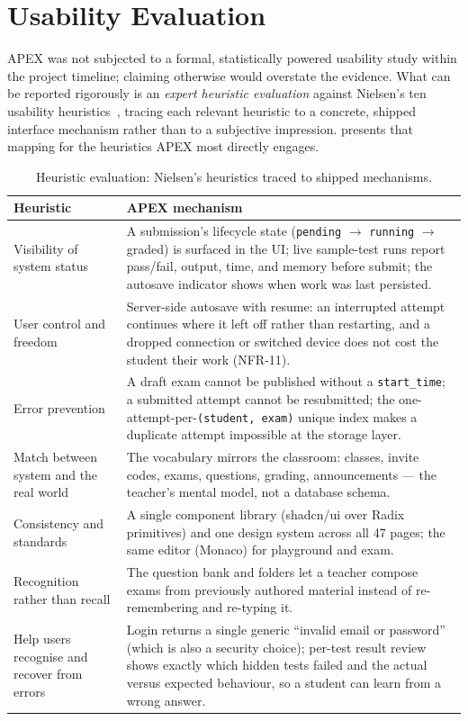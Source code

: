 \section{Usability Evaluation}
\label{sec:res-usability}

APEX was not subjected to a formal, statistically powered usability study within the
project timeline; claiming otherwise would overstate the evidence. What can be
reported rigorously is an \emph{expert heuristic evaluation}
against Nielsen's ten usability heuristics~\cite{nielsen-heuristics}, tracing each
relevant heuristic to a concrete, shipped interface mechanism rather than to a
subjective impression.  presents that mapping for the
heuristics APEX most directly engages.

\begin{table}[htbp]
\centering
\caption{Heuristic evaluation: Nielsen's heuristics traced to shipped mechanisms.}
\label{tab:res-heuristics}
\small
\begin{tabularx}{\textwidth}{@{}L{4.6cm} X@{}}
\toprule
\textbf{Heuristic} & \textbf{APEX mechanism} \\
\midrule
Visibility of system status &
A submission's lifecycle state (\texttt{pending} $\rightarrow$ \texttt{running}
$\rightarrow$ graded) is surfaced in the UI; live sample-test runs report pass/fail,
output, time, and memory before submit; the autosave indicator shows when work was
last persisted. \\
\addlinespace
User control and freedom &
Server-side autosave with resume: an interrupted attempt continues where it left off
rather than restarting, and a dropped connection or switched device does not cost the
student their work (NFR-11). \\
\addlinespace
Error prevention &
A draft exam cannot be published without a \texttt{start\_time}; a submitted attempt
cannot be resubmitted; the one-attempt-per-\texttt{(student, exam)} unique index makes
a duplicate attempt impossible at the storage layer. \\
\addlinespace
Match between system and the real world &
The vocabulary mirrors the classroom: classes, invite codes, exams, questions,
grading, announcements --- the teacher's mental model, not a database schema. \\
\addlinespace
Consistency and standards &
A single component library (shadcn/ui over Radix primitives) and one design system
across all 47 pages; the same editor (Monaco) for playground and exam. \\
\addlinespace
Recognition rather than recall &
The question bank and folders let a teacher compose exams from previously authored
material instead of re-remembering and re-typing it. \\
\addlinespace
Help users recognise and recover from errors &
Login returns a single generic ``invalid email or password'' (which is also a
security choice); per-test result review shows exactly which hidden tests failed and
the actual versus expected behaviour, so a student can learn from a wrong answer. \\
\bottomrule
\end{tabularx}
\end{table}

